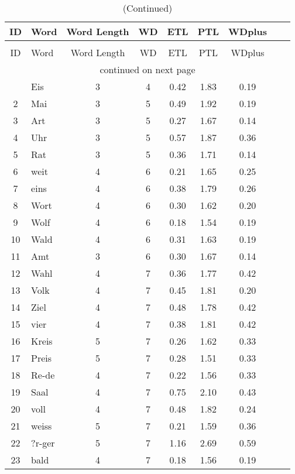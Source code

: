 {\scriptsize
\begin{longtable}{clccccccc}
\caption[wordlist]{A sample list of words.}\\
\toprule
ID & Word & Word Length & WD & ETL & PTL &  WDplus \\
\midrule
\endfirsthead
\caption[]{(Continued)}\\
\toprule
ID & Word & Word Length & WD & ETL & PTL &  WDplus \\
\midrule
\endhead
\midrule
\multicolumn{9}{c}{continued on next page}\\
\bottomrule
\endfoot
\endlastfoot
\hline
1 & Eis & 3 & 4 & 0.42 & 1.83 & 0.19 \\ \hline
2 & Mai & 3 & 5 & 0.49 & 1.92 & 0.19 \\ \hline
3 & Art & 3 & 5 & 0.27 & 1.67 & 0.14 \\ \hline
4 & Uhr & 3 & 5 & 0.57 & 1.87 & 0.36 \\ \hline
5 & Rat & 3 & 5 & 0.36 & 1.71 & 0.14 \\ \hline
6 & weit & 4 & 6 & 0.21 & 1.65 & 0.25 \\ \hline
7 & eins & 4 & 6 & 0.38 & 1.79 & 0.26 \\ \hline
8 & Wort & 4 & 6 & 0.30 & 1.62 & 0.20 \\ \hline
9 & Wolf & 4 & 6 & 0.18 & 1.54 & 0.19 \\ \hline
10 & Wald & 4 & 6 & 0.31 & 1.63 & 0.19 \\ \hline
11 & Amt & 3 & 6 & 0.30 & 1.67 & 0.14 \\ \hline
12 & Wahl & 4 & 7 & 0.36 & 1.77 & 0.42 \\ \hline
13 & Volk & 4 & 7 & 0.45 & 1.81 & 0.20 \\ \hline
14 & Ziel & 4 & 7 & 0.48 & 1.78 & 0.42 \\ \hline
15 & vier & 4 & 7 & 0.38 & 1.81 & 0.42 \\ \hline
16 & Kreis & 5 & 7 & 0.26 & 1.62 & 0.33 \\ \hline
17 & Preis & 5 & 7 & 0.28 & 1.51 & 0.33 \\ \hline
18 & Re-de & 4 & 7 & 0.22 & 1.56 & 0.33 \\ \hline
19 & Saal & 4 & 7 & 0.75 & 2.10 & 0.43 \\ \hline
20 & voll & 4 & 7 & 0.48 & 1.82 & 0.24 \\ \hline
21 & weiss & 5 & 7 & 0.21 & 1.59 & 0.36 \\ \hline
22 & ?r-ger & 5 & 7 & 1.16 & 2.69 & 0.59 \\ \hline
23 & bald & 4 & 7 & 0.18 & 1.56 & 0.19 \\ \hline

\end{longtable}}
